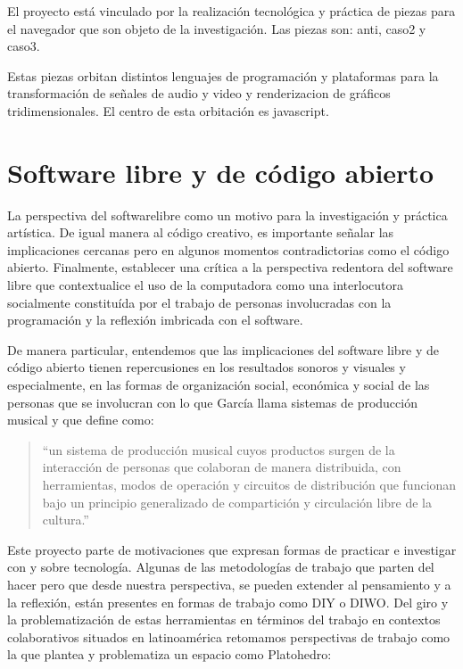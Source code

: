 El proyecto está vinculado por la realización tecnológica y práctica de piezas para el navegador que son objeto de la investigación. Las piezas son: anti, caso2 y caso3.

Estas piezas orbitan distintos lenguajes de programación y plataformas para la transformación de señales de audio y video y \gls{renderizacion} de gráficos tridimensionales. El centro de esta orbitación es \Gls{javascript}. 

\section{Software libre y de código abierto}

La perspectiva del \gls{softwarelibre} como un motivo para la investigación y práctica artística. De igual manera al código creativo, es importante señalar las implicaciones cercanas pero en algunos momentos contradictorias como el código abierto. Finalmente, establecer una crítica a la perspectiva redentora del software libre que contextualice el uso de la computadora como una interlocutora socialmente constituída por el trabajo de personas involucradas con la programación y la reflexión imbricada con el software.


De manera particular, entendemos que las implicaciones del software libre y de código abierto tienen repercusiones en los resultados sonoros y visuales y especialmente, en las formas de organización social, económica y social de las personas que se involucran con lo que García llama sistemas de producción musical y que define como:

\begin{quote}

  ``un sistema de producción musical cuyos productos surgen de la interacción de personas que colaboran de manera distribuida, con herramientas, modos de operación y circuitos de distribución que funcionan bajo un principio generalizado de compartición y circulación libre de la cultura.''\citep[p.~65]{jorgeDavid2021}

\end{quote}

Este proyecto parte de motivaciones que expresan formas de practicar e investigar con y sobre tecnología. Algunas de las metodologías de trabajo que parten del hacer pero que desde nuestra perspectiva, se pueden extender al pensamiento y a la reflexión, están presentes en formas de trabajo como DIY o DIWO. Del giro y la problematización de estas herramientas en términos del trabajo en contextos colaborativos situados en latinoamérica retomamos perspectivas de trabajo como la que plantea y problematiza un espacio como Platohedro:

